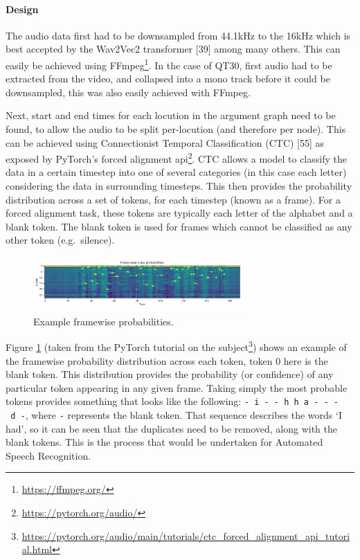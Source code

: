 \documentclass[twocolumn]{article}
\begin{document}
\paragraph{Design}\label{design}

The audio data first had to be downsampled from 44.1kHz to the 16kHz
which is best accepted by the Wav2Vec2 transformer {[}39{]} among many
others. This can easily be achieved using FFmpeg\footnote{\url{https://ffmpeg.org/}}.
In the case of QT30, first audio had to be extracted from the video, and
collapsed into a mono track before it could be downsampled, this was
also easily achieved with FFmpeg.

Next, start and end times for each locution in the argument graph need
to be found, to allow the audio to be split per-locution (and therefore
per node). This can be achieved using Connectionist Temporal
Classification (CTC) {[}55{]} as exposed by PyTorch's forced alignment
api\footnote{\url{https://pytorch.org/audio/}}. CTC allows a model to classify
the data in a certain timestep into one of several categories (in this
case each letter) considering the data in surrounding timesteps. This
then provides the probability distribution across a set of tokens, for
each timestep (known as a frame). For a forced alignment task, these
tokens are typically each letter of the alphabet and a blank token. The
blank token is used for frames which cannot be classified as any other
token (e.g.~silence).

\begin{figure}[h]
\centering
\includegraphics[width=8cm]{framewise-probs}
\caption{Example framewise probabilities. \label{fig:framewise-probs}}
\end{figure}

Figure \ref{fig:framewise-probs} (taken from the PyTorch tutorial on the
subject\footnote{\url{https://pytorch.org/audio/main/tutorials/ctc\_forced\_alignment\_api\_tutorial.html}})
shows an example of the framewise probability distribution across each
token, token 0 here is the blank token. This distribution provides the
probability (or confidence) of any particular token appearing in any
given frame. Taking simply the most probable tokens provides something
that looks like the following:
\texttt{-\ i\ -\ -\ h\ h\ a\ -\ -\ -\ d\ -}, where \texttt{-} represents
the blank token. That sequence describes the words `I had', so it can be
seen that the duplicates need to be removed, along with the blank
tokens. This is the process that would be undertaken for Automated
Speech Recognition.
\end{document}
